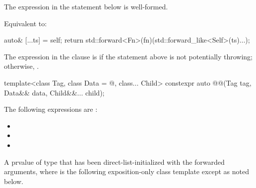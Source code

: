 \begin{itemdescr}
\pnum
\constraints
The expression in the  statement below is well-formed.

\pnum
\effects
Equivalent to:
\begin{codeblock}
auto& [...ts] = self;
return std::forward<Fn>(fn)(std::forward_like<Self>(ts)...);
\end{codeblock}

\pnum
\remarks
The expression in the  clause is 
if the  statement above is not potentially throwing;
otherwise, .
\end{itemdescr}

\begin{itemdecl}
template<class Tag, class Data = @\seebelow@, class... Child>
  constexpr auto @@(Tag tag, Data&& data, Child&&... child);
\end{itemdecl}

\begin{itemdescr}
\pnum
\mandates
The following expressions are :
\begin{itemize}
\item {}
\item {}
\item {}
\end{itemize}

\pnum
\returns
A prvalue of
type 
that has been direct-list-initialized with the forwarded arguments,
where  is the following exposition-only class template except as noted below.
\end{itemdescr}

